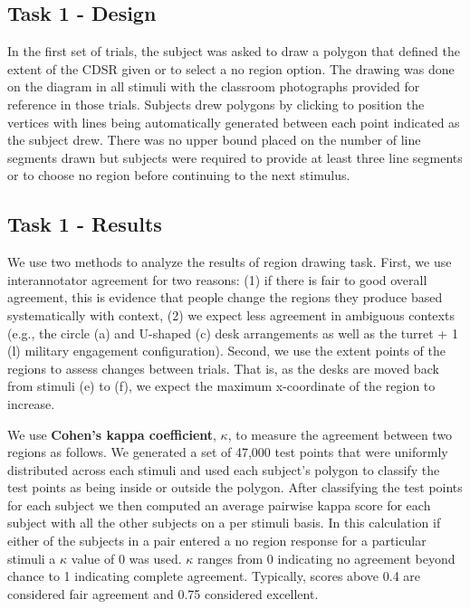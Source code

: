 \documentclass[11pt,letterpaper]{article}
\begin{document}
\subsection{Task 1 - Design}
In the first set of trials, the subject was asked to draw a polygon that defined the extent of the CDSR given or to select a no region option.  The drawing was done on the diagram in all stimuli with the classroom photographs provided for reference in those trials.  Subjects drew polygons by clicking to position the vertices with lines being automatically generated between each point indicated as the subject drew.  There was no upper bound placed on the number of line segments drawn but subjects were required to provide at least three line segments or to choose no region before continuing to the next stimulus.

\subsection{Task 1 - Results}
We use two methods to analyze the results of region drawing task.  First, we use interannotator agreement for two reasons: (1) if there is fair to good overall agreement, this is evidence that people change the regions they produce based systematically with context, (2) we expect less agreement in ambiguous contexts (e.g., the circle (a) and U-shaped (c) desk arrangements as well as the turret + 1 (l) military engagement configuration).  Second, we use the extent points of the regions to assess changes between trials.  That is, as the desks are moved back from stimuli (e) to (f), we expect the maximum x-coordinate of the region to increase.


We use \textbf{Cohen's kappa coefficient}, $\kappa$, to measure the agreement between two regions as follows.  We generated a set of 47,000 test points that were uniformly distributed across each stimuli and used each subject's polygon to classify the test points as being inside or outside the polygon. After classifying the test points for each subject we then computed an average pairwise kappa score for each subject with all the other subjects on a per stimuli basis. In this calculation if either of the subjects in a pair entered a no region response for a particular stimuli a $\kappa$ value of 0 was used.  $\kappa$ ranges from 0 indicating no agreement beyond chance to 1 indicating complete agreement.  Typically, scores above 0.4 are considered fair agreement and 0.75 considered excellent.
\end{document}
